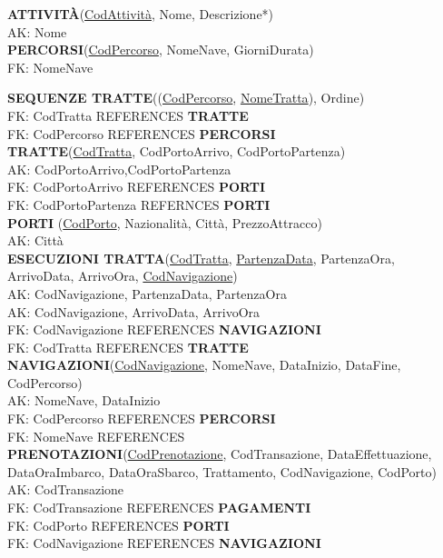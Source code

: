 \documentclass[a4paper, titlepage]{report}
\begin{document}
\noindent
\textbf{ATTIVITÀ}(\underline{CodAttività}, Nome, Descrizione*) \\
AK: Nome \\

\noindent 
\textbf{PERCORSI}(\underline{CodPercorso}, NomeNave, GiorniDurata)\\
FK: NomeNave

\noindent
\textbf{SEQUENZE TRATTE}((\underline{CodPercorso}, \underline{NomeTratta}), Ordine) \\
FK: CodTratta REFERENCES \textbf{TRATTE} \\
FK: CodPercorso REFERENCES \textbf{PERCORSI} \\

\noindent
\textbf{TRATTE}(\underline{CodTratta}, CodPortoArrivo, CodPortoPartenza) \\
AK: CodPortoArrivo,CodPortoPartenza\\
FK: CodPortoArrivo REFERENCES \textbf{PORTI}\\
FK: CodPortoPartenza REFERNCES \textbf{PORTI}\\

\noindent
\textbf{PORTI} (\underline{CodPorto}, Nazionalità, Città, PrezzoAttracco) \\
AK: Città \\

\noindent
\textbf{ESECUZIONI TRATTA}(\underline{CodTratta}, \underline{PartenzaData}, PartenzaOra, ArrivoData, ArrivoOra, \underline{CodNavigazione})\\
AK: CodNavigazione, PartenzaData, PartenzaOra\\
AK: CodNavigazione, ArrivoData, ArrivoOra\\
FK: CodNavigazione REFERENCES \textbf{NAVIGAZIONI}\\
FK: CodTratta REFERENCES \textbf{TRATTE}\\

\noindent
\textbf{NAVIGAZIONI}(\underline{CodNavigazione}, NomeNave, DataInizio, DataFine, CodPercorso) \\
AK: NomeNave, DataInizio\\
FK: CodPercorso REFERENCES \textbf{PERCORSI}\\
FK: NomeNave REFERENCES \textbf\\

\noindent
\textbf{PRENOTAZIONI}(\underline{CodPrenotazione}, CodTransazione, DataEffettuazione, DataOraImbarco, DataOraSbarco, Trattamento, CodNavigazione, CodPorto) \\
AK: CodTransazione \\
FK: CodTransazione REFERENCES \textbf{PAGAMENTI}\\
FK: CodPorto REFERENCES \textbf{PORTI}\\
FK: CodNavigazione REFERENCES \textbf{NAVIGAZIONI}\\
\end{document}
